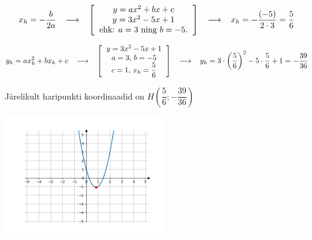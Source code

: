 \begin{center}
{{{\begin{flushleft}
\[x_{h}=-\dfrac{b}{2a} \hspace{3mm} \longrightarrow \hspace{3mm} \left[ \begin{tabular}{c}
$y=ax^{2}+bx+c$\\
$y=3x^{2}-5x+1$\\
ehk: $a=3$ ning $b=-5$.
\end{tabular} \right] \hspace{3mm} \longrightarrow \hspace{3mm} x_{h}=-\dfrac{(-5)}{2\cdot 3} = \dfrac{5}{6} \]

\vspace{2mm}
\[ y_{h}=ax_{h}^{2}+bx_{h}+c \hspace{3mm} \longrightarrow \hspace{3mm} \left[ \begin{tabular}{c}
$y=3x^{2}-5x+1$\\
$a=3$, $b=-5$\\
$c=1$, $x_{h}=\dfrac{5}{6}$
\end{tabular} \right]  \hspace{3mm} \longrightarrow \hspace{3mm} y_{h}=3 \cdot \left( \dfrac{5}{6}\right)^{2} -5 \cdot \dfrac{5}{6} +1 = -\dfrac{39}{36} \]

\hspace{5mm}
Järelikult haripunkti koordinaadid on $H\left( \dfrac{5}{6};-\dfrac{39}{36} \right)$ 

\hspace{5mm}
\begin{center}
\begin{minipage}{7cm}
  \includegraphics[width=7cm]{37_joonis1.png}
  \label{37_joonis1}
\end{minipage}
\end{center}

\end{flushleft}
}}}
\end{center}

